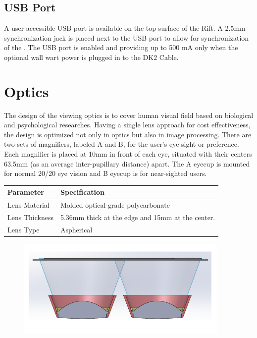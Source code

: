 \documentclass[letterpaper]{article}
\begin{document}
\subsection{USB Port}
A user accessible USB port is available on the top surface of the Rift.  A 2.5mm synchronization jack is placed next to the USB port to allow for synchronization of the .  The USB port is enabled and providing up to 500 mA only when the optional wall wart power is plugged in to the DK2 Cable.

\newpage

\section{Optics}
The design of the viewing optics is to cover human visual field based on biological and psychological researches. Having a single lens approach for cost effectiveness, the design is optimized not only in optics but also in image processing. There are two sets of magnifiers, labeled A and B, for the user's eye sight or preference. Each magnifier is placed at 10mm in front of each eye, situated with their centers 63.5mm (as an average inter-pupillary distance) apart. The A eyecup is mounted for normal 20/20 eye vision and B eyecup is for near-sighted users.

\begin{center}
    \begin{tabular}{ | l | p{8cm} |}
    \hline
    \cellcolor{lightgray} Parameter & \cellcolor{lightgray} Specification \\ \hline
    Lens Material & Molded optical-grade polycarbonate \\ \hline
    Lens Thickness & 5.36mm thick at the edge and 15mm at the center. \\ \hline
    Lens Type & Aspherical \\ \hline
    \end{tabular}
\end{center}

\begin{figure}[H]  
  \centering
    \includegraphics[width=0.92\textwidth]{Figures/image1-15.png}
\end{figure}
\end{document}
